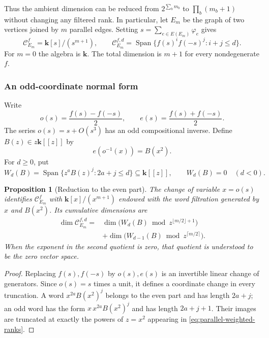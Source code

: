 \documentclass[reqno]{article}
\theoremstyle{plain} %
\newtheorem{proposition}[theorem]{Proposition}
\theoremstyle{definition}
\theoremstyle{remark}
\DeclareMathOperator{\Span}{Span}
\newcommand{\K} {\mathbf{k}}
\newcommand {\CC}{\mathscr{C}}
\numberwithin{equation}{section}
\begin{document}
Thus the ambient dimension can be reduced from $2^{\sum_bm_b}$ to
$\prod_b(m_b+1)$ without changing any filtered rank. In particular, let
$E_m$ be the graph of two vertices joined by $m$ parallel edges. Setting
$s=\sum_{e\in E(E_m)}\varphi_e$ gives
\begin{equation}\label{eq:multiedge}
 \CC_{E_m}^f=\K[s]/(s^{m+1}),\qquad
 \CC_{E_m}^{f,d}=\Span\{f(s)^if(-s)^j:i+j\le d\}.
\end{equation}
For $m=0$ the algebra is $\K$. The total dimension is $m+1$ for every
nondegenerate $f$.

\subsubsection{An odd-coordinate normal form}

Write
\[
 o(s)=\frac{f(s)-f(-s)}2,\qquad
 e(s)=\frac{f(s)+f(-s)}2.
\]
The series $o(s)=s+O(s^3)$ has an odd compositional inverse. Define
$B(z)\in z\K[[z]]$ by
\begin{equation}\label{eq:parallel-even-jet}
 e(o^{-1}(x))=B(x^2).
\end{equation}
For $d\ge0$, put
\[
 W_d(B)=\Span\{z^aB(z)^j:2a+j\le d\}\subseteq\K[[z]],
 \qquad W_d(B)=0\quad(d<0).
\]

\begin{proposition}[Reduction to the even part]
\label{prop:parallel-normal-form}
The change of variable $x=o(s)$ identifies $\CC_{E_m}^f$ with
$\K[x]/(x^{m+1})$ endowed with the word filtration generated by
$x$ and $B(x^2)$. Its cumulative dimensions are
\begin{equation}\label{eq:parallel-weighted-ranks}
\begin{split}
 \dim\CC_{E_m}^{f,d}
 ={}&\dim\bigl(W_d(B)\bmod z^{\lfloor m/2\rfloor+1}\bigr)\\
 &+\dim\bigl(W_{d-1}(B)\bmod z^{\lceil m/2\rceil}\bigr).
\end{split}
\end{equation}
When the exponent in the second quotient is zero, that quotient is
understood to be the zero vector space.
\end{proposition}
\begin{proof}
Replacing $f(s),f(-s)$ by $o(s),e(s)$ is an invertible linear change
of generators. Since $o(s)=s$ times a unit, it defines a coordinate
change in every truncation. A word $x^{2a}B(x^2)^j$ belongs to the even
part and has length $2a+j$; an odd word has the form
$x\,x^{2a}B(x^2)^j$ and has length $2a+j+1$. Their images are truncated
at exactly the powers of $z=x^2$ appearing in
\eqref{eq:parallel-weighted-ranks}.
\end{proof}
\end{document}
